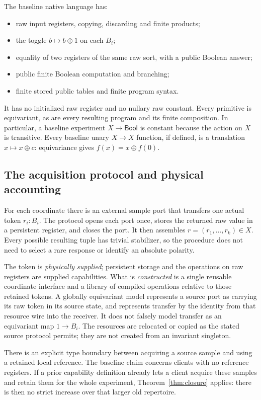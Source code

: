 \documentclass[11pt]{article}
\theoremstyle{definition}
\theoremstyle{remark}
\newcommand{\Bool}{\mathsf{Bool}}
\begin{document}
The baseline native language has:
\begin{itemize}
\item raw input registers, copying, discarding and finite products;
\item the toggle $b\mapsto b\oplus1$ on each $B_i$;
\item equality of two registers of the same raw sort, with a public Boolean answer;
\item public finite Boolean computation and branching;
\item finite stored public tables and finite program syntax.
\end{itemize}
It has no initialized raw register and no nullary raw constant. Every primitive is equivariant, as are every resulting program and its finite composition. In particular, a baseline experiment $X\to\Bool$ is constant because the action on $X$ is transitive. Every baseline unary $X\to X$ function, if defined, is a translation $x\mapsto x\oplus c$: equivariance gives $f(x)=x\oplus f(0)$.

\subsection{The acquisition protocol and physical accounting}
For each coordinate there is an external sample port that transfers one actual token $r_i:B_i$. The protocol opens each port once, stores the returned raw value in a persistent register, and closes the port. It then assembles $r=(r_1,\ldots,r_k)\in X$. Every possible resulting tuple has trivial stabilizer, so the procedure does not need to select a rare response or identify an absolute polarity.

The token is \emph{physically supplied}; persistent storage and the operations on raw registers are supplied capabilities. What is \emph{constructed} is a single reusable coordinate interface and a library of compiled operations relative to those retained tokens. A globally equivariant model represents a source port as carrying its raw token in its source state, and represents transfer by the identity from that resource wire into the receiver. It does not falsely model transfer as an equivariant map $1\to B_i$. The resources are relocated or copied as the stated source protocol permits; they are not created from an invariant singleton.

There is an explicit type boundary between acquiring a source sample and using a retained local reference. The baseline claim concerns clients with no reference registers. If a prior capability definition already lets a client acquire these samples and retain them for the whole experiment, Theorem~\ref{thm:closure} applies: there is then no strict increase over that larger old repertoire.
\end{document}
